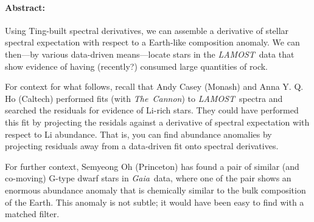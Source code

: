 \documentclass[12pt]{article}
\newcommand{\project}[1]{\textsl{#1}}
\newcommand{\acronym}[1]{{\small{#1}}}
\newcommand{\LAMOST}{\project{\acronym{LAMOST}}}
\newcommand{\TheCannon}{\project{The~Cannon}}
\newcommand{\Gaia}{\project{Gaia}}
\begin{document}
\raggedbottom\sloppy\sloppypar\frenchspacing

\paragraph{Abstract:}
Using Ting-built spectral derivatives,
we can assemble a derivative of stellar spectral expectation with respect
to a Earth-like composition anomaly.
We can then---by various data-driven means---locate stars in the
\LAMOST\ data that show evidence of having (recently?) consumed
large quantities of rock.

\biskip

For context for what follows, recall that Andy Casey (Monash) and Anna
Y. Q. Ho (Caltech) performed fits (with \TheCannon) to
\LAMOST\ spectra and searched the residuals for evidence of
Li-rich stars.
They could have performed this fit by projecting the
residals against a derivative of spectral expectation with respect
to Li abundance.
That is, you can find abundance anomalies by projecting residuals away
from a data-driven fit onto spectral derivatives.

For further context, Semyeong Oh (Princeton) has found a pair of similar
(and co-moving) G-type dwarf stars in \Gaia\ data, where one of the pair
shows an enormous abundance anomaly that is chemically similar to the
bulk composition of the Earth.
This anomaly is not subtle; it would have been easy to find with a matched
filter.
\end{document}
